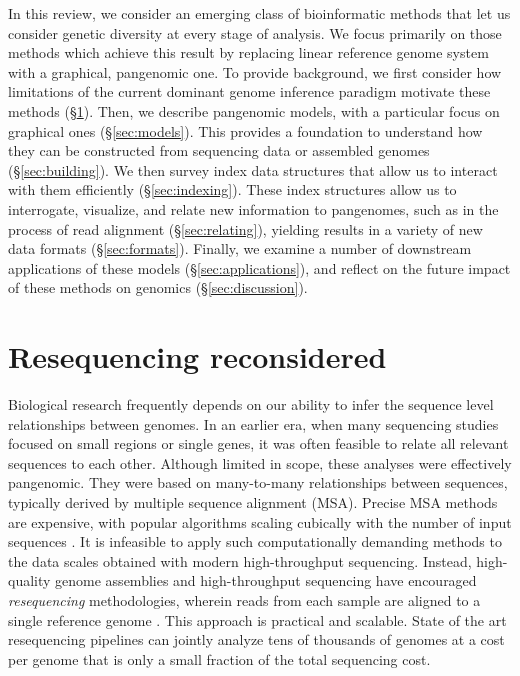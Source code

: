 In this review, we consider an emerging class of bioinformatic methods that let us consider genetic diversity at every stage of analysis.
We focus primarily on those methods which achieve this result by replacing linear reference genome system with a graphical, pangenomic one.
To provide background, we first consider how limitations of the current dominant genome inference paradigm motivate these methods (\S \ref{sec:resequencing}).
Then, we describe pangenomic models, with a particular focus on graphical ones (\S \ref{sec:models}).
This provides a foundation to understand how they can be constructed from sequencing data or assembled genomes (\S \ref{sec:building}).
We then survey index data structures that allow us to interact with them efficiently (\S \ref{sec:indexing}).
These index structures allow us to interrogate, visualize, and relate new information to pangenomes, such as in the process of read alignment (\S \ref{sec:relating}), yielding results in a variety of new data formats (\S \ref{sec:formats}).
Finally, we examine a number of downstream applications of these models (\S \ref{sec:applications}), and reflect on the future impact of these methods on genomics (\S \ref{sec:discussion}).

\section{Resequencing reconsidered}
\label{sec:resequencing}

Biological research frequently depends on our ability to infer the sequence level relationships between genomes.
In an earlier era, when many sequencing studies focused on small regions or single genes, it was often feasible to relate all relevant sequences to each other.
Although limited in scope, these analyses were effectively pangenomic.
They were based on many-to-many relationships between sequences, typically derived by multiple sequence alignment (MSA).
Precise MSA methods are expensive, with popular algorithms scaling cubically with the number of input sequences \cite{notredame2000t}.
It is infeasible to apply such computationally demanding methods to the data scales obtained with modern high-throughput sequencing.
Instead, high-quality genome assemblies and high-throughput sequencing have encouraged \emph{resequencing} methodologies, wherein reads from each sample are aligned to a single reference genome \cite{stratton2008genome}.
This approach is practical and scalable.
State of the art resequencing pipelines can jointly analyze tens of thousands of genomes \cite{Poplin_2017} at a cost per genome that is only a small fraction of the total sequencing cost.

